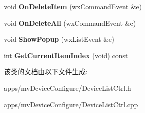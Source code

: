 \begin{DoxyCompactItemize}
\item 
\hypertarget{class_log_output_list_ctrl_aaa6b426610c66afc4d1290aa3a9213f4}{void {\bfseries On\+Delete\+Item} (wx\+Command\+Event \&e)}\label{class_log_output_list_ctrl_aaa6b426610c66afc4d1290aa3a9213f4}

\item 
\hypertarget{class_log_output_list_ctrl_a25d4d5d6487c2fff375400b403c4c773}{void {\bfseries On\+Delete\+All} (wx\+Command\+Event \&e)}\label{class_log_output_list_ctrl_a25d4d5d6487c2fff375400b403c4c773}

\item 
\hypertarget{class_log_output_list_ctrl_ab05c168e86f4fa1000aa7ea69a38b027}{void {\bfseries Show\+Popup} (wx\+List\+Event \&e)}\label{class_log_output_list_ctrl_ab05c168e86f4fa1000aa7ea69a38b027}

\item 
\hypertarget{class_log_output_list_ctrl_a5a03df4c0ba352cd55b0e8bf6259fb0b}{int {\bfseries Get\+Current\+Item\+Index} (void) const }\label{class_log_output_list_ctrl_a5a03df4c0ba352cd55b0e8bf6259fb0b}

\end{DoxyCompactItemize}


该类的文档由以下文件生成\+:\begin{DoxyCompactItemize}
\item 
apps/mv\+Device\+Configure/Device\+List\+Ctrl.\+h\item 
apps/mv\+Device\+Configure/Device\+List\+Ctrl.\+cpp\end{DoxyCompactItemize}
